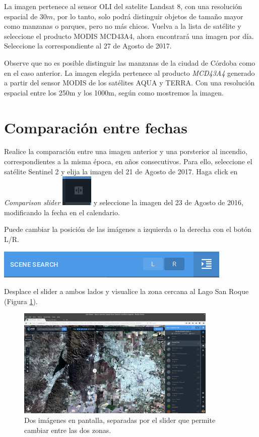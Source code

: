 \documentclass[a4paper,12pt]{book}
\begin{document}
La imagen pertenece al sensor OLI del satelite Landsat 8, con una resolución espacial de $30m$, por lo tanto, solo podrá distinguir objetos de tamaño mayor como manzanas o parques, pero no más chicos.%
Vuelva a la lista de satélite y seleccione el producto MODIS MCD43A4, ahora encontrará una imagen por día. Seleccione la correspondiente al 27 de Agosto de 2017.

Observe que no es posible distinguir las manzanas de la ciudad de Córdoba como en el caso anterior. La imagen elegida pertenece al producto \emph{MCD43A4} generado a partir del sensor MODIS de los satélites AQUA y TERRA. Con una resolución espacial entre los 250m y los 1000m, según como mostremos la imagen.

\section{Comparación entre fechas}
Realice la comparación entre una imagen anterior y una porsterior al incendio, correspondientes a la misma época, en años consecutivos. Para ello, seleccione el satélite Sentinel 2 y elija la imagen del 21 de Agosto de 2017. Haga click en \emph{Comparison slider} \includegraphics[scale=0.2]{in:LR.png} y seleccione la imagen del 23 de Agosto de 2016, modificando la fecha en el calendario.

Puede cambiar la posición de las imágenes a izquierda o la derecha con el botón L/R.

\begin{center}\includegraphics[scale=0.4]{in:LorR.png}\end{center}

Desplace el slider a ambos lados y visualice la zona cercana al Lago San Roque (Figura \ref{fig:slider}).

\begin{figure}[h!]
    \centering
    \includegraphics[width=0.85\textwidth]{fig:slider.png}
    \caption{Dos imágenes en pantalla, separadas por el slider que permite cambiar entre las dos zonas.}
    \label{fig:slider}
\end{figure}
\end{document}
